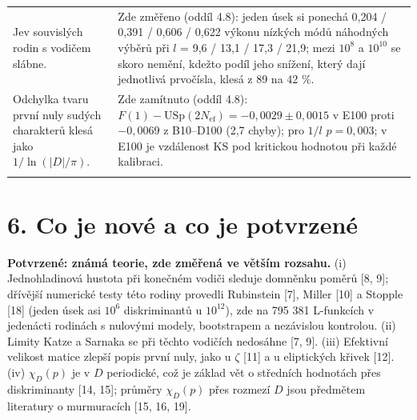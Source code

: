 \documentclass[
  10pt,
]{article}
\begin{document}
{\begin{longtable}[]{@{}
  >{\raggedright\arraybackslash}p{}
  >{\raggedright\arraybackslash}p{}@{}}
Jev souvislých rodin s vodičem slábne. & Zde změřeno (oddíl 4.8): jeden
úsek si ponechá 0,204 / 0,391 / 0,606 / 0,622 výkonu nízkých módů
náhodných výběrů při \(l\) = 9,6 / 13,1 / 17,3 / 21,9; mezi \(10^8\) a
\(10^{10}\) se skoro nemění, kdežto podíl jeho snížení, který dají
jednotlivá prvočísla, klesá z 89 na 42 \%. \\ \addlinespace[2pt]
Odchylka tvaru první nuly sudých charakterů klesá jako
\(1/\ln(|D|/\pi)\). & Zde zamítnuto (oddíl 4.8):
\(F(1) - \mathrm{USp}(2N_{\mathrm{ef}}) = -0{,}0029 \pm 0{,}0015\) v
E100 proti \(-0{,}0069\) z B10--D100 (2,7 chyby); pro \(1/l\)
\(p = 0{,}003\); v E100 je vzdálenost KS pod kritickou hodnotou při
každé kalibraci. \\ \addlinespace[2pt]
\end{longtable}}

\hypertarget{co-je-novuxe9-a-co-je-potvrzenuxe9}{%
\section{6. Co je nové a co je
potvrzené}\label{co-je-novuxe9-a-co-je-potvrzenuxe9}}

\textbf{Potvrzené: známá teorie, zde změřená ve větším rozsahu.} (i)
Jednohladinová hustota při konečném vodiči sleduje domněnku poměrů {[}8,
9{]}; dřívější numerické testy této rodiny provedli Rubinstein {[}7{]},
Miller {[}10{]} a Stopple {[}18{]} (jeden úsek asi \(10^6\)
diskriminantů u \(10^{12}\)), zde na 795 381 L-funkcích v jedenácti
rodinách s nulovými modely, bootstrapem a nezávislou kontrolou. (ii)
Limity Katze a Sarnaka se při těchto vodičích nedosáhne {[}7, 9{]}.
(iii) Efektivní velikost matice zlepší popis první nuly, jako u
\(\zeta\) {[}11{]} a u eliptických křivek {[}12{]}. (iv) \(\chi_D(p)\)
je v \(D\) periodické, což je základ vět o středních hodnotách přes
diskriminanty {[}14, 15{]}; průměry \(\chi_D(p)\) přes rozmezí \(D\)
jsou předmětem literatury o murmuracích {[}15, 16, 19{]}.
\end{document}

